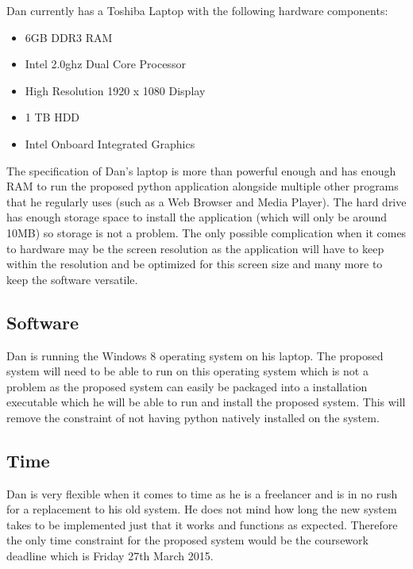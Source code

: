 \begin{flushleft}
	Dan currently has a Toshiba Laptop with the following hardware components:
	
	\begin{itemize}
		\item 6GB DDR3 RAM
		\item Intel 2.0ghz Dual Core Processor
		\item High Resolution 1920 x 1080 Display
		\item 1 TB HDD
		\item Intel Onboard Integrated Graphics
	\end{itemize}

	The specification of Dan's laptop is more than powerful enough and has enough RAM to run the proposed python application alongside multiple other programs that he regularly uses (such as a Web Browser and Media Player). The hard drive has enough storage space to install the application (which will only be around 10MB) so storage is not a problem. The only possible complication when it comes to hardware may be the screen resolution as the application will have to keep within the resolution and be optimized for this screen size and many more to keep the software versatile.
\end{flushleft}

\subsection{Software}

\begin{flushleft}
	Dan is running the Windows 8 operating system on his laptop. The proposed system will need to be able to run on this operating system which is not a problem as the proposed system can easily be packaged into a installation executable which he will be able to run and install the proposed system. This will remove the constraint of not having python natively installed on the system.

\end{flushleft}

\subsection{Time}

\begin{flushleft}
 	Dan is very flexible when it comes to time as he is a freelancer and is in no rush for a replacement to his old system. He does not mind how long the new system takes to be implemented just that it works and functions as expected. Therefore the only time constraint for the proposed system would be the coursework deadline which is Friday 27th March 2015.
\end{flushleft}

